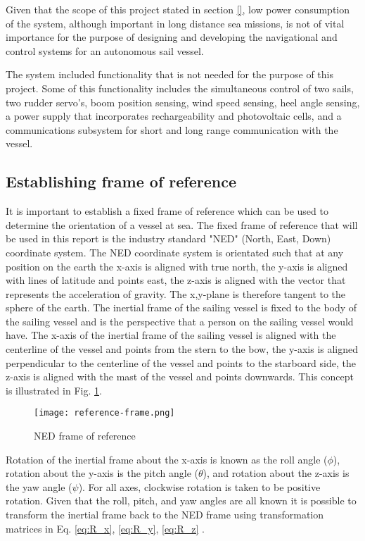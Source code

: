 Given that the scope of this project stated in section \ref{}, low power consumption of the system, although important in long distance sea missions, is not of vital importance for 
the purpose of designing and developing the navigational and control systems for an autonomous sail vessel. 

The system included functionality that is not needed for the purpose of this project. Some of this functionality includes the simultaneous 
control of two sails, two rudder servo's, boom position sensing, wind speed sensing, heel angle sensing, a power supply that incorporates rechargeability and photovoltaic cells, and a 
communications subsystem for short and long range communication with the vessel.

\subsection{Establishing frame of reference}
\label{sec:reference_frame}

It is important to establish a fixed frame of reference which can be used to determine the orientation of a vessel at sea. The fixed frame of reference that will be used in this report 
is the industry standard "NED" (North, East, Down) coordinate system. The NED coordinate system is orientated such that at any position on the earth the x-axis is aligned with true north, 
the y-axis is aligned with lines of latitude and points east, the z-axis is aligned with the vector that represents the acceleration of gravity. The x,y-plane is therefore tangent to the 
sphere of the earth. The inertial frame of the sailing vessel is fixed to the body of the sailing vessel and is the perspective that a person on the sailing vessel would have. The x-axis of 
the inertial frame of the sailing vessel is aligned with the centerline of the vessel and points from the stern to the bow, the y-axis is aligned perpendicular to the centerline of the vessel
and points to the starboard side, the z-axis is aligned with the mast of the vessel and points downwards. This concept is illustrated in Fig. \ref{fig:reference_frame}. 

\begin{figure}[!h]
    \centering
    \texttt{[image: reference-frame.png]}
    \caption[NED frame of reference]{NED frame of reference}
    \label{fig:reference_frame}
\end{figure}

Rotation of the inertial frame about the x-axis is known as the roll angle ($\phi$), rotation about the y-axis is the pitch angle ($\theta$), and rotation about the z-axis is the yaw angle 
($\psi$). For all axes, clockwise rotation is taken to be positive rotation. Given that the roll, pitch, and yaw angles are all known it is possible to transform the inertial frame back to 
the NED frame using transformation matrices in Eq. \ref{eq:R_x}, \ref{eq:R_y}, \ref{eq:R_z} \cite{e_compass}. 

